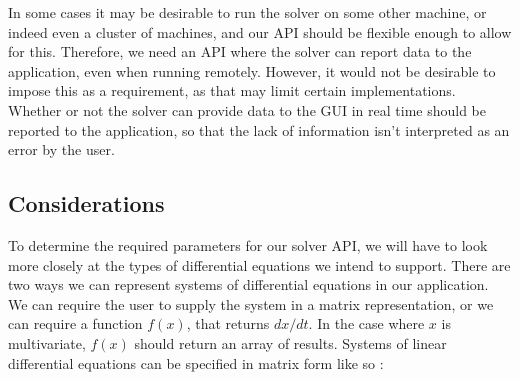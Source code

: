 \documentclass[\rootfolder/main.tex]{subfiles}
\begin{document}
In some cases it may be desirable to run the solver on some other machine, or indeed even a cluster of machines, and our API should be flexible enough to allow for this.
Therefore, we need an API where the solver can report data to the application, even when running remotely.
However, it would not be desirable to impose this as a requirement, as that may limit certain implementations.
Whether or not the solver can provide data to the GUI in real time should be reported to the application, so that the lack of information isn't interpreted as an error by the user.

\subsection{Considerations}

To determine the required parameters for our solver API, we will have to look more closely at the types of differential equations we intend to support.
There are two ways we can represent systems of differential equations in our application.
We can require the user to supply the system in a matrix representation, or we can require a function $f(x)$, that returns $dx/dt$.
In the case where $x$ is multivariate, $f(x)$ should return an array of results.
Systems of linear differential equations can be specified in matrix form like so \cite{kreyzig}:
\end{document}
